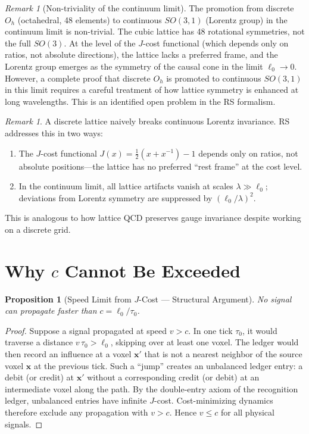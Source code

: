 \documentclass[12pt,a4paper]{article}
\newtheorem{proposition}[theorem]{Proposition}
\theoremstyle{definition}
\theoremstyle{remark}
\newtheorem{remark}[theorem]{Remark}
\begin{document}
\begin{remark}[Non-triviality of the continuum limit]
The promotion from discrete $O_h$ (octahedral, 48 elements) to
continuous $SO(3,1)$ (Lorentz group) in the continuum limit is
non-trivial.  The cubic lattice has 48 rotational symmetries, not
the full $SO(3)$.  At the level of the $J$-cost functional (which
depends only on ratios, not absolute directions), the lattice lacks
a preferred frame, and the Lorentz group emerges as the symmetry of
the causal cone in the limit $\ell_0 \to 0$.  However, a complete
proof that discrete $O_h$ is promoted to continuous $SO(3,1)$ in this
limit requires a careful treatment of how lattice symmetry is enhanced
at long wavelengths.  This is an identified open problem in the RS
formalism.
\end{remark}

\begin{remark}
A discrete lattice naively breaks continuous Lorentz invariance.
RS addresses this in two ways:
\begin{enumerate}[label=(\roman*),nosep]
  \item The $J$-cost functional $J(x) = \frac{1}{2}(x+x^{-1})-1$
  depends only on ratios, not absolute positions---the lattice
  has no preferred ``rest frame'' at the cost level.
  \item In the continuum limit, all lattice artifacts vanish at
  scales $\lambda \gg \ell_0$; deviations from Lorentz symmetry
  are suppressed by $(\ell_0/\lambda)^2$.
\end{enumerate}
This is analogous to how lattice QCD preserves gauge invariance
despite working on a discrete grid.
\end{remark}

\section{Why $c$ Cannot Be Exceeded}

\begin{proposition}[Speed Limit from $J$-Cost --- Structural Argument]
No signal can propagate faster than $c = \ell_0/\tau_0$.
\end{proposition}

\begin{proof}
Suppose a signal propagated at speed $v > c$.  In one tick $\tau_0$, it
would traverse a distance $v\,\tau_0 > \ell_0$, skipping over at least
one voxel.  The ledger would then record an influence at a voxel
$\mathbf{x}'$ that is not a nearest neighbor of the source voxel
$\mathbf{x}$ at the previous tick.  Such a ``jump'' creates an
unbalanced ledger entry: a debit (or credit) at $\mathbf{x}'$ without
a corresponding credit (or debit) at an intermediate voxel along the
path.  By the double-entry axiom of the recognition ledger, unbalanced
entries have infinite $J$-cost.  Cost-minimizing dynamics therefore
exclude any propagation with $v > c$.  Hence $v \leq c$ for all
physical signals.
\end{proof}
\end{document}
